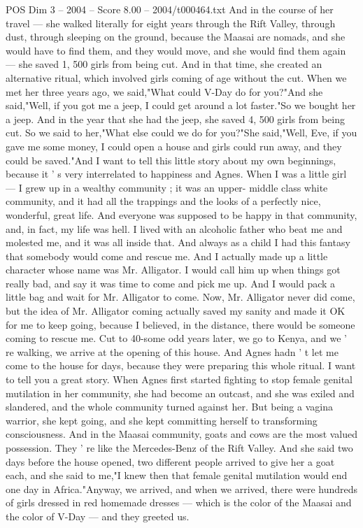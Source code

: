 \begin{textsample}{POS Dim 3 – 2004 – Score 8.00 – 2004/t000464.txt}
And in the course of her travel — she walked literally for eight years through the Rift Valley, through dust, through sleeping on the ground, because the Maasai are nomads, and she would have to find them, and they would move, and she would find them again — she saved 1, 500 girls from being cut.
And in that time, she created an alternative ritual, which involved girls coming of age without the cut.
When we met her three years ago, we said,"What could V-Day do for you?"And she said,"Well, if you got me a jeep, I could get around a lot faster."So we bought her a jeep.
And in the year that she had the jeep, she saved 4, 500 girls from being cut.
So we said to her,"What else could we do for you?"She said,"Well, Eve, if you gave me some money, I could open a house and girls could run away, and they could be saved."And I want to tell this little story about my own beginnings, because it ' s very interrelated to happiness and Agnes.
When I was a little girl — I grew up in a wealthy community ; it was an upper- middle class white community, and it had all the trappings and the looks of a perfectly nice, wonderful, great life.
And everyone was supposed to be happy in that community, and, in fact, my life was hell.
I lived with an alcoholic father who beat me and molested me, and it was all inside that.
And always as a child I had this fantasy that somebody would come and rescue me.
And I actually made up a little character whose name was Mr.
Alligator.
I would call him up when things got really bad, and say it was time to come and pick me up.
And I would pack a little bag and wait for Mr.
Alligator to come.
Now, Mr.
Alligator never did come, but the idea of Mr.
Alligator coming actually saved my sanity and made it OK for me to keep going, because I believed, in the distance, there would be someone coming to rescue me.
Cut to 40-some odd years later, we go to Kenya, and we ' re walking, we arrive at the opening of this house.
And Agnes hadn ' t let me come to the house for days, because they were preparing this whole ritual.
I want to tell you a great story.
When Agnes first started fighting to stop female genital mutilation in her community, she had become an outcast, and she was exiled and slandered, and the whole community turned against her.
But being a vagina warrior, she kept going, and she kept committing herself to transforming consciousness.
And in the Maasai community, goats and cows are the most valued possession.
They ' re like the Mercedes-Benz of the Rift Valley.
And she said two days before the house opened, two different people arrived to give her a goat each, and she said to me,"I knew then that female genital mutilation would end one day in Africa."Anyway, we arrived, and when we arrived, there were hundreds of girls dressed in red homemade dresses — which is the color of the Maasai and the color of V-Day — and they greeted us.

\end{textsample}
